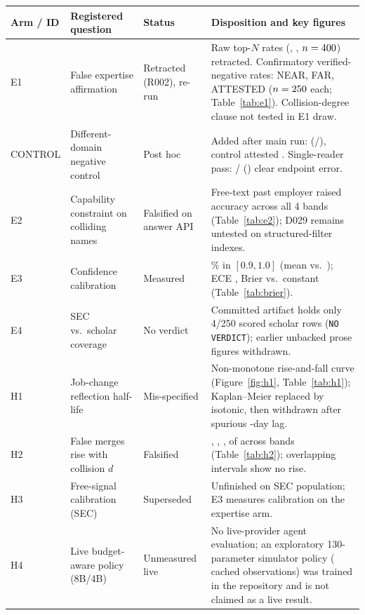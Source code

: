 \documentclass[11pt]{article}
\begin{document}
\begin{table}[!htb]
\centering\footnotesize
\begin{tabularx}{\linewidth}{@{}l>{\raggedright\arraybackslash}p{2.7cm}>{\raggedright\arraybackslash}p{2.3cm}>{\raggedright\arraybackslash}X@{}}
\toprule
Arm / ID & Registered question & Status & Disposition and key figures \\
\midrule
E1 & False expertise affirmation & Retracted (R002), re-run & Raw top-$N$ rates (\tiRawFar{}, \tiRawNear{}, $n=400{}$) retracted. Confirmatory verified-negative rates: \tiNearRate{} NEAR, \tiFarRate{} FAR, \tiAttRate{} ATTESTED ($n=250{}$ each; Table~\ref{tab:e1}). Collision-degree clause not tested in E1 draw. \\
CONTROL & Different-domain negative control & Post hoc & Added after main run: \tiCtlRate{} (\tiCtlK{}/\tiCtlN{}), control attested \tiCtlAttRate{}. Single-reader pass: \tiRdOther{}/\tiCtlK{} (\tiRdErrRate{}) clear endpoint error. \\
E2 & Capability constraint on colliding names & Falsified on answer API & Free-text past employer raised accuracy across all 4 bands (Table~\ref{tab:e2}); D029 remains untested on structured-filter indexes. \\
E3 & Confidence calibration & Measured & \tiCalTopShare{}\% in $[0.9, 1.0]$ (mean \tiCalTopConf{} vs.\ \tiCalTopAcc{}); ECE \tiEce{}, Brier \tiBrier{} vs.\ constant \tiBrierBase{} (Table~\ref{tab:brier}). \\
E4 & SEC vs.\ scholar coverage & No verdict & Committed artifact holds only 4/250 scored scholar rows (\texttt{NO VERDICT}); earlier unbacked prose figures withdrawn. \\
H1 & Job-change reflection half-life & Mis-specified & Non-monotone rise-and-fall curve (Figure~\ref{fig:h1}, Table~\ref{tab:h1}); Kaplan--Meier replaced by isotonic, then withdrawn after spurious \tiHoneIsoLag{}-day lag. \\
H2 & False merges rise with collision $d$ & Falsified & \tiHtwoUK{}, \tiHtwoLK{}, \tiHtwoMK{}, \tiHtwoHK{} of \tiHtwoUN{} across bands (Table~\ref{tab:h2}); overlapping intervals show no rise. \\
H3 & Free-signal calibration (SEC) & Superseded & Unfinished on SEC population; E3 measures calibration on the expertise arm. \\
H4 & Live budget-aware policy (8B/4B) & Unmeasured live & No live-provider agent evaluation; an exploratory 130-parameter simulator policy (\tiEnvObs{} cached observations) was trained in the repository and is not claimed as a live result. \\

\end{tabularx}
\end{table}
\end{document}
